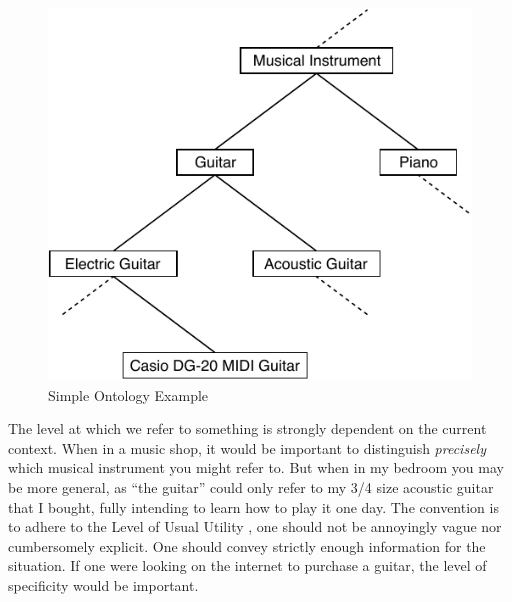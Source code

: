 \begin{figure}[h]
    \includegraphics[width=0.8\linewidth, left]{graphics/level_of_specificity.pdf}
  \caption{Simple Ontology Example}
  \label{fig:ontology}
\end{figure}

The level at which we refer to something is strongly dependent on the current context. When in a music shop, it would be important to distinguish \textit{precisely} which musical instrument you might refer to. But when in my bedroom you may be more general, as ``the guitar'' could only refer to my 3/4 size acoustic guitar that I bought, fully intending to learn how to play it one day. The convention is to adhere to the Level of Usual Utility \cite{brown1958shall}, one should not be annoyingly vague nor cumbersomely explicit. One should convey strictly enough information for the situation. If one were looking on the internet to purchase a guitar, the level of specificity would be important.  



